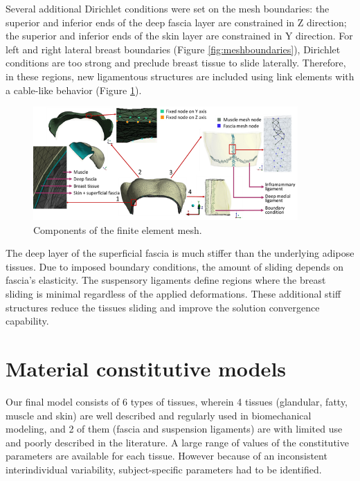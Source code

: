 Several additional Dirichlet conditions were set on the mesh boundaries: the superior and inferior ends of the deep fascia layer are constrained in Z direction; the superior and inferior ends of the skin layer are constrained in Y direction. For left and right lateral breast boundaries (Figure \ref{fig:meshboundaries}), Dirichlet conditions are too strong and preclude breast tissue to slide laterally. Therefore, in these regions, new ligamentous structures are included using link elements with a cable-like behavior (Figure \ref{fig:mesh_components_BC}).



\begin{figure}[!h]
\centering
\includegraphics[width=0.9\textwidth,keepaspectratio]{figures/mesh_components.png} 
\caption{Components of the finite element mesh.}\label{fig:mesh_components_BC}
\end{figure}

 The deep layer of the superficial fascia is much stiffer than the underlying adipose tissues. Due to imposed boundary conditions, the amount of sliding depends on fascia's elasticity. The suspensory ligaments define regions where the breast sliding is minimal regardless of the applied deformations. These additional stiff structures reduce the tissues sliding and improve the solution convergence capability. 

\section{Material constitutive models}
\label{section:myConstitutivModels}

Our final model consists of 6 types of tissues, wherein 4 tissues (glandular, fatty, muscle and skin) are well described and regularly used in biomechanical modeling, and 2 of them (fascia and suspension ligaments) are with limited use and poorly described in the literature. A large range of values of the constitutive parameters are available for each tissue. However because of an inconsistent interindividual variability, subject-specific parameters had to be identified.  



